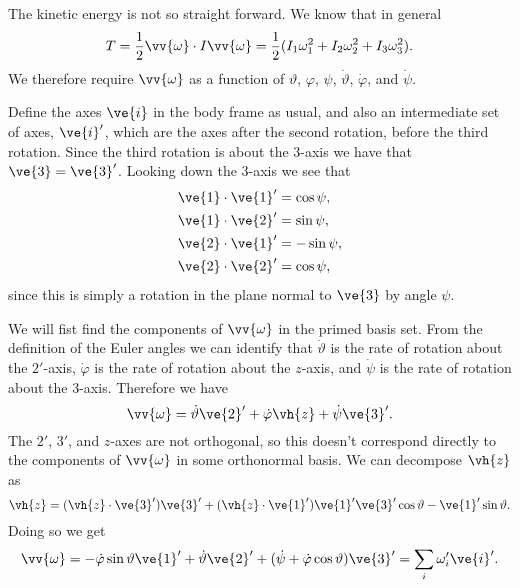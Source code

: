 \documentclass[fleqn]{NotesClass}
\begin{document}
    The kinetic energy is not so straight forward.
    We know that in general
    \begin{equation}
        T = \frac{1}{2}\vv{\omega} \cdot I \vv{\omega} = \frac{1}{2}(I_1\omega_1^2 + I_2\omega_2^2 + I_3\omega_3^2).
    \end{equation}
    We therefore require \(\vv{\omega}\) as a function of \(\vartheta\), \(\varphi\), \(\psi\), \(\dot{\vartheta}\), \(\dot{\varphi}\), and \(\dot{\psi}\).
    
    Define the axes \(\ve{i}\) in the body frame as usual, and also an intermediate set of axes, \(\ve{i}'\), which are the axes after the second rotation, before the third rotation.
    Since the third rotation is about the \(3\)-axis we have that \(\ve{3} = \ve{3}'\).
    Looking down the \(3\)-axis we see that
    \begin{align}
        \ve{1} \cdot \ve{1}' &= \cos\psi,\\
        \ve{1} \cdot \ve{2}' &= \sin\psi,\\
        \ve{2} \cdot \ve{1}' &= -\sin\psi,\\
        \ve{2} \cdot \ve{2}' &= \cos\psi,
    \end{align}
    since this is simply a rotation in the plane normal to \(\ve{3}\) by angle \(\psi\).
    
    We will fist find the components of \(\vv{\omega}\) in the primed basis set.
    From the definition of the Euler angles we can identify that \(\dot{\vartheta}\) is the rate of rotation about the \(2'\)-axis, \(\dot{\varphi}\) is the rate of rotation about the \(z\)-axis, and \(\dot{\psi}\) is the rate of rotation about the \(3\)-axis.
    Therefore we have
    \begin{equation}
        \vv{\omega} = \dot{\vartheta}\ve{2}' + \dot{\varphi}\vh{z} + \dot{\psi}\ve{3}'.
    \end{equation}
    The \(2'\), \(3'\), and \(z\)-axes are not orthogonal, so this doesn't correspond directly to the components of \(\vv{\omega}\) in some orthonormal basis.
    We can decompose \(\vh{z}\) as
    \begin{equation}
        \vh{z} = (\vh{z} \cdot \ve{3}') \ve{3}' + (\vh{z} \cdot \ve{1}') \ve{1}' \ve{3}'\cos\vartheta - \ve{1}'\sin\vartheta.
    \end{equation}
    Doing so we get
    \begin{equation}
        \vv{\omega} = -\dot{\varphi} \sin\vartheta\ve{1}' + \dot{\vartheta}\ve{2}' + (\dot{\psi} + \dot{\varphi}\cos\vartheta)\ve{3}' = \sum_{i} \omega_i'\ve{i}'.
    \end{equation}
    
\end{document}
